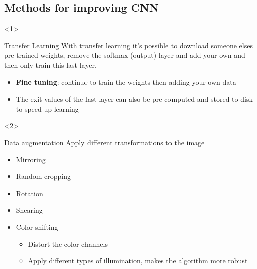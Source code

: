 \subsection{Methods for improving CNN}
\begin{frame}{\insertsubsec}
    \begin{onlyenv}<1>
        \begin{block}{Transfer Learning}
            With transfer learning it's possible to download someone elses pre-trained weights, 
            remove the softmax (output) layer and add your own and then only train this last layer.
            \begin{itemize}
                \item \textbf{Fine tuning}: continue to train the weights then adding your own data
                \item The exit values of the last layer can also be pre-computed and stored to disk
                to speed-up learning
            \end{itemize}
        \end{block}
    \end{onlyenv}
    \begin{onlyenv}<2>
        \begin{block}{Data augmentation}
            Apply different transformations to the image
            \begin{itemize}
                \item Mirroring
                \item Random cropping
                \item Rotation
                \item Shearing
                \item Color shifting
                \begin{itemize}
                    \item Distort the color channels
                    \item Apply different types of illumination, makes the algorithm more robust
                \end{itemize}
            \end{itemize}
        \end{block}
    \end{onlyenv}
\end{frame}

